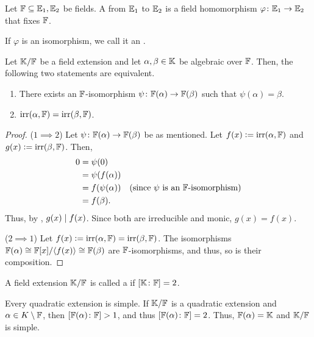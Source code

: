 \begin{defn}
    Let $\mathbb{F} \subseteq \mathbb{E}_1, \mathbb{E}_2$ be fields. A  from $\mathbb{E}_1$ to $\mathbb{E}_2$ is a field homomorphism $\varphi \colon \mathbb{E}_1 \to \mathbb{E}_2$ that fixes $\mathbb{F}$.
    
    If $\varphi$ is an isomorphism, we call it an .
\end{defn}

\begin{prop}
    Let $\mathbb{K}/\mathbb{F}$ be a field extension and let $\alpha, \beta \in \mathbb{K}$ be algebraic over $\mathbb{F}$. Then, the following two statements are equivalent. 
    \begin{enumerate}
        \item There exists an $\mathbb{F}$-isomorphism $\psi \colon \mathbb{F}(\alpha) \to \mathbb{F}(\beta)$ such that $\psi(\alpha) = \beta$.
        \item $\operatorname{irr}(\alpha, \mathbb{F}) = \operatorname{irr}(\beta, \mathbb{F})$.
    \end{enumerate}
\end{prop}
\begin{proof}
    ($1 \implies 2$) Let $\psi \colon \mathbb{F}(\alpha) \to \mathbb{F}(\beta)$ be as mentioned. Let $f(x) \vcentcolon= \operatorname{irr}(\alpha, \mathbb{F})$ and $g(x) \vcentcolon= \operatorname{irr}(\beta, \mathbb{F})$. Then,
    \begin{align*}
        0 &= \psi(0) \\
        &= \psi(f(\alpha)) \\
        &= f(\psi(\alpha)) &\text{(since $\psi$ is an $\mathbb{F}$-isomorphism)} \\
        &= f(\beta).
    \end{align*}
    Thus, by , $g(x) \mid f(x)$. Since both are irreducible and monic, $g(x) = f(x)$. 
    
    ($2 \implies 1$) Let $f(x) \vcentcolon= \operatorname{irr}(\alpha, \mathbb{F}) = \operatorname{irr}(\beta, \mathbb{F})$. The isomorphisms $\mathbb{F}(\alpha) \cong \mathbb{F}[x]/\langle f(x) \rangle \cong \mathbb{F}(\beta)$ are $\mathbb{F}$-isomorphisms, and thus, so is their composition.
\end{proof}

\begin{defn}
    A field extension $\mathbb{K}/\mathbb{F}$ is called a  if $[\mathbb{K} \colon \mathbb{F}] = 2$. 
\end{defn}
\begin{rem}
    Every quadratic extension is simple. If $\mathbb{K}/\mathbb{F}$ is a quadratic extension and $\alpha \in K \setminus \mathbb{F}$, then $[\mathbb{F}(\alpha) \colon \mathbb{F}] > 1$, and thus $[\mathbb{F}(\alpha) \colon \mathbb{F}] = 2$. Thus, $\mathbb{F}(\alpha) = \mathbb{K}$ and $\mathbb{K}/\mathbb{F}$ is simple.
\end{rem}

